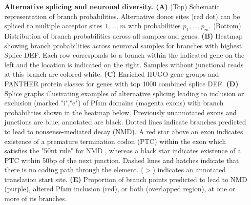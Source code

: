 \textbf{Alternative splicing and neuronal diversity. (A)} (Top) Schematic representation of branch probabilities. Alternative donor sites (red dot) can be spliced to multiple acceptor sites $1,\ldots, m$ with probabilities $p_{1},\ldots,p_{m}$. (Bottom) Distribution of branch probabilities across all samples and genes. \textbf{(B)} Heatmap showing branch probabilities across neuronal samples for branches with highest Splice DEF. Each row corresponds to a branch within the indicated gene on the left and the location is indicated on the right. Samples without junctional reads at this branch are colored white. \textbf{(C)} Enriched HUGO gene groups and PANTHER protein classes for genes with top 1000 combined splice DEF. \textbf{(D)} Splice graphs illustrating examples of alternative splicing leading to inclusion or exclusion (marked "i","e") of Pfam domains (magenta exons) with branch probabilities shown in the heatmap below. Previously unannotated exons and junctions are blue; annotated are black. Dotted lines indicate branches predicted to lead to nonsense-mediated decay (NMD). A red star above an exon indicates existence of a premature termination codon (PTC) within the exon which satisfies the "50nt rule" for NMD \citep{Nagy_1998}, whereas a black star indicates existence of a PTC within 50bp of the next junction. Dashed lines and hatches indicate that there is no coding path through the element. ($\gt$) indicates an annotated translation start site. \textbf{(E)} Proportion of branch points predicted to lead to NMD (purple), altered Pfam inclusion (red), or both (overlapped region), at one or more of its branches.
